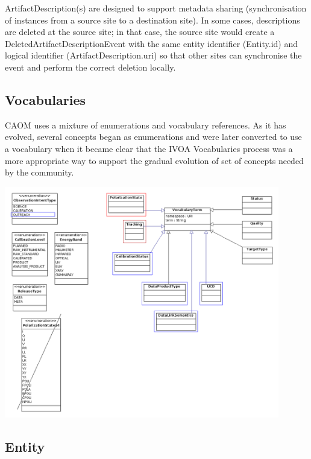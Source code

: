 \documentclass[11pt,a4paper]{ivoa}
\begin{document}
ArtifactDescription(s) are designed to support metadata sharing (synchronisation of instances
from a source site to a destination site). In some cases, descriptions are deleted at the 
source site; in that case, the source site would create a DeletedArtifactDescriptionEvent with 
the same entity identifier (Entity.id) and logical identifier (ArtifactDescription.uri) so that 
other sites can synchronise the event and perform the correct deletion locally.

\subsection{Vocabularies}

CAOM uses a mixture of enumerations and vocabulary references. As it has evolved,
several concepts began as enumerations and were later converted to use a vocabulary
when it became clear that the IVOA Vocabularies process was a more appropriate way
to support the gradual evolution of set of concepts needed by the community.

\begin{center}
\includegraphics[width=0.9\textwidth]{src/uml/CAOM3vocabularies.png}
\label{fig:vocab}
\end{center}

\subsection{Entity}
\end{document}
